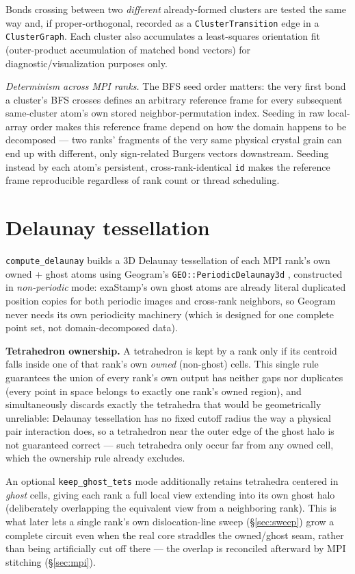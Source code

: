 \documentclass[11pt,a4paper]{article}
\newcommand{\op}[1]{\texttt{#1}}
\newcommand{\field}[1]{\texttt{#1}}
\newcommand{\code}[1]{\texttt{#1}}
\begin{document}
Bonds crossing between two \emph{different} already-formed clusters are tested the same way and, if
proper-orthogonal, recorded as a \code{ClusterTransition} edge in a \code{ClusterGraph}. Each
cluster also accumulates a least-squares orientation fit (outer-product accumulation of matched
bond vectors) for diagnostic/visualization purposes only.

\emph{Determinism across MPI ranks.} The BFS seed order matters: the very first bond a cluster's
BFS crosses defines an arbitrary reference frame for every subsequent same-cluster atom's own stored
neighbor-permutation index. Seeding in raw local-array order makes this reference frame depend on
how the domain happens to be decomposed — two ranks' fragments of the very same physical crystal
grain can end up with different, only sign-related Burgers vectors downstream. Seeding instead by
each atom's persistent, cross-rank-identical \field{id} makes the reference frame reproducible
regardless of rank count or thread scheduling.

\section{Delaunay tessellation}

\op{compute\_delaunay} builds a 3D Delaunay tessellation of each MPI rank's own owned + ghost atoms
using Geogram's \code{GEO::PeriodicDelaunay3d} \cite{geogram}, constructed in \emph{non-periodic}
mode: exaStamp's own ghost atoms are already literal duplicated position copies for both periodic
images and cross-rank neighbors, so Geogram never needs its own periodicity machinery (which is
designed for one complete point set, not domain-decomposed data).

\textbf{Tetrahedron ownership.} A tetrahedron is kept by a rank only if its centroid falls inside
one of that rank's own \emph{owned} (non-ghost) cells. This single rule guarantees the union of
every rank's own output has neither gaps nor duplicates (every point in space belongs to exactly
one rank's owned region), and simultaneously discards exactly the tetrahedra that would be
geometrically unreliable: Delaunay tessellation has no fixed cutoff radius the way a physical pair
interaction does, so a tetrahedron near the outer edge of the ghost halo is not guaranteed correct —
such tetrahedra only occur far from any owned cell, which the ownership rule already excludes.

An optional \code{keep\_ghost\_tets} mode additionally retains tetrahedra centered in \emph{ghost}
cells, giving each rank a full local view extending into its own ghost halo (deliberately
overlapping the equivalent view from a neighboring rank). This is what later lets a single rank's
own dislocation-line sweep (\S\ref{sec:sweep}) grow a complete circuit even when the real core
straddles the owned/ghost seam, rather than being artificially cut off there — the overlap is
reconciled afterward by MPI stitching (\S\ref{sec:mpi}).
\end{document}
